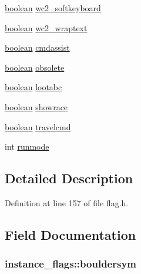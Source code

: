 \begin{DoxyCompactItemize}
\item 
\hyperlink{global_8h_a531b10dd351aa162d7dcccd1966308b8}{boolean} \hyperlink{structinstance__flags_ad2bead45f3c69306cd123eaa8d1b296f}{wc2\+\_\+softkeyboard}
\item 
\hyperlink{global_8h_a531b10dd351aa162d7dcccd1966308b8}{boolean} \hyperlink{structinstance__flags_a30ed864bd7a69483c6ca4eefbcf628b5}{wc2\+\_\+wraptext}
\item 
\hyperlink{global_8h_a531b10dd351aa162d7dcccd1966308b8}{boolean} \hyperlink{structinstance__flags_a9205d199fb280444af9315a6640250b9}{cmdassist}
\item 
\hyperlink{global_8h_a531b10dd351aa162d7dcccd1966308b8}{boolean} \hyperlink{structinstance__flags_ab0968d97c0dc56d2458bbc3ac6fd7025}{obsolete}
\item 
\hyperlink{global_8h_a531b10dd351aa162d7dcccd1966308b8}{boolean} \hyperlink{structinstance__flags_a4e7bf81f6c7abf2059b03f6cb3287690}{lootabc}
\item 
\hyperlink{global_8h_a531b10dd351aa162d7dcccd1966308b8}{boolean} \hyperlink{structinstance__flags_ab12d17fe0bcca460f333ef2b29f1d249}{showrace}
\item 
\hyperlink{global_8h_a531b10dd351aa162d7dcccd1966308b8}{boolean} \hyperlink{structinstance__flags_a7c470716a5fefc018e79229f65f217a2}{travelcmd}
\item 
int \hyperlink{structinstance__flags_a395895542513cb9177e88f330ba18575}{runmode}
\end{DoxyCompactItemize}


\subsection{Detailed Description}


Definition at line 157 of file flag.\+h.



\subsection{Field Documentation}
\hypertarget{structinstance__flags_a13b4941aee2fefcb8d1d6a24b77396a3}{
\subsubsection[{bouldersym}]{ instance\+\_\+flags\+::bouldersym}}\label{structinstance__flags_a13b4941aee2fefcb8d1d6a24b77396a3}


